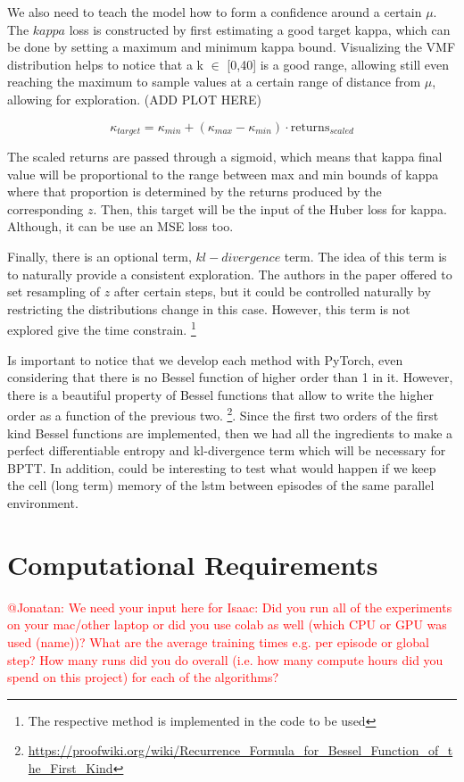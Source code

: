 \documentclass{article}  %
\begin{document}
We also need to teach the model how to form a confidence around a certain $\mu$. The $kappa$ loss is constructed by first estimating a good target kappa,
which can be done by setting a maximum and minimum kappa bound. Visualizing the VMF distribution helps to notice that a k $\in$ [0,40] is a good range,
allowing still even reaching the maximum to sample values at a certain range of distance from $\mu$, allowing for exploration. (ADD PLOT HERE)

\begin{equation}
    \kappa_{target} = \kappa_{min} + (\kappa_{max} - \kappa_{min}) \cdot \text{returns}_{scaled}
\end{equation}

The scaled returns are passed through a sigmoid, which means that kappa final value will be proportional to the range between max and min bounds of 
kappa where that proportion is determined by the returns produced by the corresponding $z$.
Then, this target will be the input of the Huber loss for kappa. Although, it can be use an MSE loss too. 

Finally, there is an optional term, $kl-divergence$ term. The idea of this term is to naturally provide a consistent exploration. The authors in the paper 
offered to set resampling of $z$ after certain steps, but it could be controlled naturally by restricting the distributions change in this case. However, this term is not 
explored give the time constrain. \footnote{The respective method is implemented in the code to be used}

Is important to notice that we develop each method with PyTorch, even considering that there is no Bessel function of higher order than 1 in it. 
However, there is a beautiful property of Bessel functions that allow to write the higher order as a function of the previous two.
\footnote{\url{https://proofwiki.org/wiki/Recurrence_Formula_for_Bessel_Function_of_the_First_Kind}}. Since the first two 
orders of the first kind Bessel functions are implemented, then we had all the ingredients to make a perfect differentiable entropy and kl-divergence term which will be necessary for BPTT.
In addition, could be interesting to test what would happen if we keep the cell (long term) memory of the lstm between episodes of the same parallel
environment. 

\section*{Computational Requirements}
\noindent \textcolor{red}{@Jonatan: We need your input here for Isaac: Did you run all of the experiments on your mac/other laptop
or did you use colab as well (which CPU or GPU was used (name))? What are the average training times
e.g. per episode or global step? How many runs did you do overall (i.e. how many compute hours did you
spend on this project) for each of the algorithms?}
\end{document}
